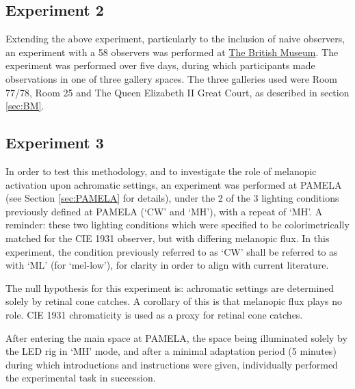 \subsection{Experiment 2}

Extending the above experiment, particularly to the inclusion of naive observers, an experiment with a 58 observers was performed at \hyperref[sec:BM]{The British Museum}. The experiment was performed over five days, during which participants made observations in one of three gallery spaces. The three galleries used were Room 77/78, Room 25 and The Queen Elizabeth II Great Court, as described in section \ref{sec:BM}. 

\subsection{Experiment 3}
In order to test this methodology, and to investigate the role of melanopic activation upon achromatic settings, an experiment was performed at \gls{PAMELA} (see Section \ref{sec:PAMELA} for details), under the 2 of the 3 lighting conditions previously defined at \gls{PAMELA} (`CW' and `MH'), with a repeat of `MH'. A reminder: these two lighting conditions which were specified to be colorimetrically matched for the CIE 1931 observer, but with differing melanopic flux. In this experiment, the condition previously referred to as `CW' shall be referred to as with `ML' (for `mel-low'), for clarity in order to align with current literature.

The null hypothesis for this experiment is: achromatic settings are determined solely by retinal cone catches. A corollary of this is that melanopic flux plays no role. CIE 1931 chromaticity is used as a proxy for retinal cone catches.




After entering the main space at \gls{PAMELA}, the space being illuminated solely by the \gls{LED} rig in `MH' mode, and after a minimal adaptation period (5 minutes) during which introductions and instructions were given, individually performed the experimental task in succession. 

